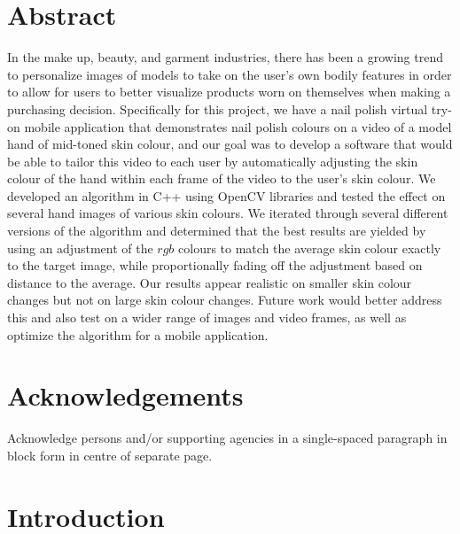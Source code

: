 \documentclass[12pt, a4paper]{article}
\begin{document}


\renewcommand{\thepage}{\roman{page}}%
\setcounter{page}{1}

\section*{Abstract}
In the make up, beauty, and garment industries, there has been a growing trend to personalize images of models to take on the user's own bodily features in order to allow for users to better visualize products worn on themselves when making a purchasing decision. Specifically for this project, we have a nail polish virtual try-on mobile application that demonstrates nail polish colours on a video of a model hand of mid-toned skin colour, and our goal was to develop a software that would be able to tailor this video to each user by automatically adjusting the skin colour of the hand within each frame of the video to the user's skin colour. We developed an algorithm in C++ using OpenCV libraries and tested the effect on several hand images of various skin colours. We iterated through several different versions of the algorithm and determined that the best results are yielded by using an adjustment of the $rgb$ colours to match the average skin colour exactly to the target image, while proportionally fading off the adjustment based on distance to the average. Our results appear realistic on smaller skin colour changes but not on large skin colour changes. Future work would better address this and also test on a wider range of images and video frames, as well as optimize the algorithm for a mobile application.

\pagebreak

\section*{Acknowledgements}
Acknowledge persons and/or supporting agencies in a single-spaced paragraph in block form in centre of separate page.
\pagebreak

\tableofcontents
\pagebreak

\listoffigures
\listoftables
\pagebreak

\renewcommand{\nomname}{List of Symbols}
\printnomenclature
\pagebreak

\renewcommand{\thepage}{\arabic{page}}%
\setcounter{page}{1}

\section{Introduction}

\pagebreak
\end{document}
